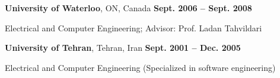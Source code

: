 \documentclass[margin,line,letterpaper]{resume}
\begin{document}
\begin{resume}
    \textbf{University of Waterloo},  ON, Canada \hfill \textbf{ Sept. 2006 -- Sept. 2008}\\\vspace{-4.5mm}%
    \begin{list2}
        \item     Electrical and Computer Engineering;  Advisor:  Prof. Ladan Tahvildari
    \end{list2}\vspace{-1.5mm}
    \textbf{University of Tehran}, Tehran, Iran \hfill \textbf{ Sept. 2001 -- Dec. 2005}\vspace{-3mm}\\\vspace{-1.5mm}%
    \begin{list2}
        \item  Electrical and Computer Engineering (Specialized in software engineering)
    \end{list2}\vspace{-1.5mm}



\end{resume}
\end{document}
